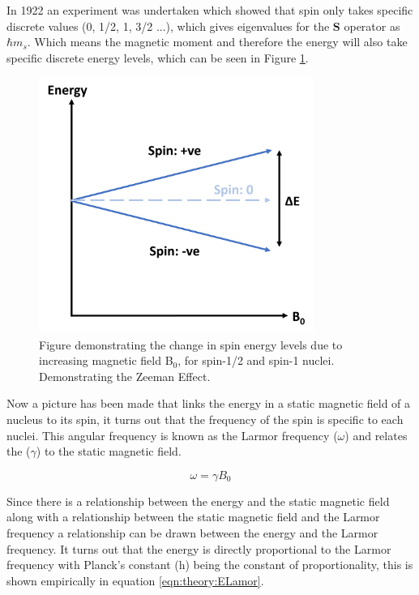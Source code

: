 \documentclass[class=article, crop=false]{standalone}
\begin{document}
In 1922 an experiment was undertaken\cite{Gerlach1922DerMagnetfeld} which showed that spin only takes specific discrete values (0, 1/2, 1, 3/2 ...), which gives eigenvalues for the $\mathbf{S}$ operator as $\hbar m_s$. Which means the magnetic moment and therefore the energy will also take specific discrete energy levels, which can be seen in Figure \ref{fig:theory:zeeman}.

\begin{figure}[h]
    \centering
    \includegraphics[width=0.8\textwidth]{Figures/Theory/Zeeman.png}
    \caption{Figure demonstrating the change in spin energy levels due to increasing magnetic field B$_0$, for spin-1/2 and spin-1 nuclei. Demonstrating the Zeeman Effect\cite{Zeeman1896VerslagenAfdeeling}.}
    \label{fig:theory:zeeman}
\end{figure}

Now a picture has been made that links the energy in a static magnetic field of a nucleus to its spin, it turns out that the frequency of the spin is specific to each nuclei. This angular frequency is known as the Larmor frequency\cite{Larmor1897LXIII.Ions} ($\omega$) and relates the ($\gamma$) to the static magnetic field.

\begin{equation}
    \omega = \gamma B_0
    \label{eqn:theory:Lamor}
\end{equation}

Since there is a relationship between the energy and the static magnetic field along with a relationship between the static magnetic field and the Larmor frequency a relationship can be drawn between the energy and the Larmor frequency. It turns out that the energy is directly proportional to the Larmor frequency with Planck's constant (h) being the constant of proportionality, this is shown empirically in equation \ref{eqn:theory:ELamor}.
\end{document}
